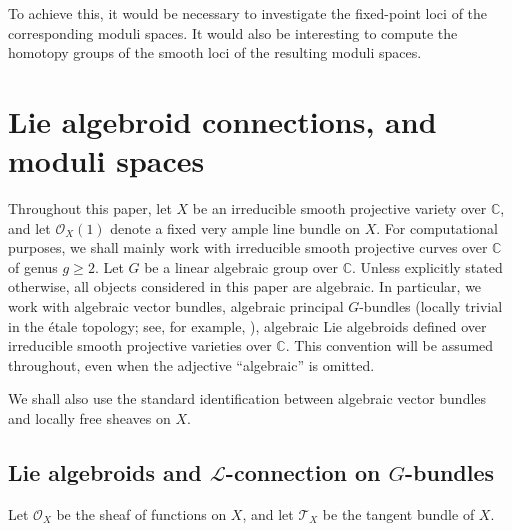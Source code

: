 \documentclass[12pt,reqno]{amsart}
\newcommand{\mc}[1]{\mathcal{#1}}
\numberwithin{equation}{subsection}
\theoremstyle{definition}
\theoremstyle{theorem}
\begin{document}
To achieve this, it would be necessary to investigate the fixed-point loci of the corresponding moduli spaces. It would also be interesting to compute the homotopy groups of the smooth loci of the resulting moduli spaces.




\section{Lie algebroid connections, and moduli spaces}

Throughout this paper, let $X$ be an irreducible smooth projective variety over $\mathbb{C}$, and let $\mathcal{O}_X(1)$ denote a fixed very ample line bundle on $X$. For computational purposes, we shall mainly work with irreducible smooth projective curves over $\mathbb{C}$ of genus $g \geq 2$. Let $G$ be a linear algebraic group over $\mathbb{C}$. Unless explicitly stated otherwise, all objects considered in this paper are algebraic. In particular, we work with algebraic vector bundles, algebraic principal $G$-bundles (locally trivial in the \'{e}tale topology; see, for example, \cite{Sch-2008, C.Sorger-1999}), algebraic Lie algebroids defined over irreducible smooth projective varieties over $\mathbb{C}$. This convention will be assumed throughout, even when the adjective ``algebraic'' is omitted.

We shall also use the standard identification between algebraic vector bundles and locally free sheaves on $X$.

\subsection{Lie algebroids and $\mathcal{L}$-connection on $G$-bundles}
Let $\mc O_X$ be the sheaf of functions on $X$, and let 
$\mathcal{T}_{X}$ be the tangent bundle of $X$. 
\end{document}
